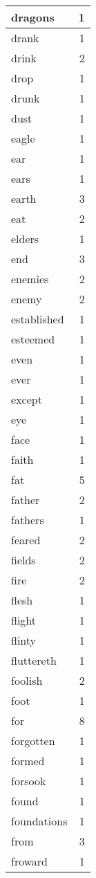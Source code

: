 \begin{center}
\begin{longtable}{l|r}
dragons & 1 \\ \hline
drank & 1 \\ \hline
drink & 2 \\ \hline
drop & 1 \\ \hline
drunk & 1 \\ \hline
dust & 1 \\ \hline
eagle & 1 \\ \hline
ear & 1 \\ \hline
ears & 1 \\ \hline
earth & 3 \\ \hline
eat & 2 \\ \hline
elders & 1 \\ \hline
end & 3 \\ \hline
enemies & 2 \\ \hline
enemy & 2 \\ \hline
established & 1 \\ \hline
esteemed & 1 \\ \hline
even & 1 \\ \hline
ever & 1 \\ \hline
except & 1 \\ \hline
eye & 1 \\ \hline
face & 1 \\ \hline
faith & 1 \\ \hline
fat & 5 \\ \hline
father & 2 \\ \hline
fathers & 1 \\ \hline
feared & 2 \\ \hline
fields & 2 \\ \hline
fire & 2 \\ \hline
flesh & 1 \\ \hline
flight & 1 \\ \hline
flinty & 1 \\ \hline
fluttereth & 1 \\ \hline
foolish & 2 \\ \hline
foot & 1 \\ \hline
for & 8 \\ \hline
forgotten & 1 \\ \hline
formed & 1 \\ \hline
forsook & 1 \\ \hline
found & 1 \\ \hline
foundations & 1 \\ \hline
from & 3 \\ \hline
froward & 1 \\ \hline

\end{longtable}
\end{center}
